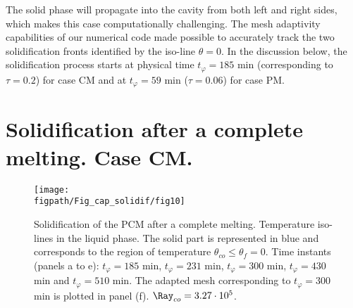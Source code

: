  The solid phase will propagate into the cavity from both left and right sides, which makes this case computationally challenging. The mesh adaptivity capabilities of our numerical code made possible to accurately track the 
two solidification fronts identified by the iso-line $\theta=0$.  
In the discussion below,  the solidification process starts at physical time $t_{\varphi} = 185 $ min (corresponding to $\tau=0.2$) for case CM and at $t_{\varphi} = 59$ min ($\tau=0.06$) for case PM. 

\section{Solidification after a complete melting. Case CM.} \label{sec_solid_full} 

\begin{figure}
	\begin{center}
		\texttt{[image: \\figpath/Fig\_cap\_solidif/fig10]}
	\end{center}
	\caption{Solidification of the PCM after a complete melting. 
	Temperature iso-lines in the liquid phase. 
	The solid part is represented in blue and corresponds to the region of temperature $\theta_{co} \leq \theta_f=0$. 
	Time instants (panels  a to e): $t_{\varphi} = 185$ min, $t_{\varphi} = 231$ min, $t_{\varphi} = 300$ min, $t_{\varphi} = 430$ min and $t_{\varphi} = 510$ min. 
	The adapted mesh corresponding to $t_{\varphi} = 300$ min is plotted in panel (f).  $\Ray_{co}=3.27 \cdot 10^5$. }\label{fig:evolution}
\end{figure}

